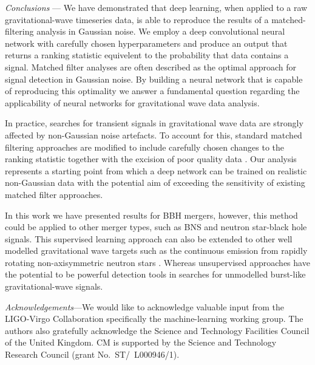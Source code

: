 \documentclass[%
showpacs,
 amsmath,amssymb,
 aps,
 twocolumn,
 prl,
 reprint,
floatfix,
]{revtex4-1}
\begin{document}
%
%
\textit{Conclusions} --- 
%
%
We have demonstrated that deep learning, when applied to a raw
gravitational-wave timeseries data, is able to reproduce the results of a
matched-filtering analysis in Gaussian noise. We employ a deep convolutional
neural network with carefully chosen hyperparameters and produce an output that
returns a ranking statistic equivelent to the probability that data contains a
signal. Matched filter analyses are often described as the optimal approach for
signal detection in Gaussian noise. By building a neural network that is
capable of reproducing this optimality we answer a fundamental question
regarding the applicability of neural networks for gravitational wave data
analysis. 

%
%
In practice, searches for transient signals in gravitational wave data are
strongly affected by non-Gaussian noise artefacts. To account for this,
standard matched filtering approaches are modified to include carefully chosen
changes to the ranking statistic together with the excision of poor quality
data \cite{0264-9381-28-23-235005}. Our analysis
represents a starting point from which a deep network can be trained on
realistic non-Gaussian data with the potential aim of exceeding the sensitivity
of existing matched filter approaches.

%
%
In this work we have presented results for \ac{BBH} mergers, however, this
method could be applied to other merger types, such as \ac{BNS} and neutron
star-black hole signals. This supervised learning approach can also be extended
to other well modelled gravitational wave targets such as the continuous
emission from rapidly rotating non-axisymmetric neutron stars \cite{1707.02669}. Whereas unsupervised approaches have the
potential to be powerful detection tools in searches for unmodelled burst-like
gravitational-wave signals. 

%
%
\emph{Acknowledgements}---We would like to acknowledge valuable input from the
LIGO-Virgo Collaboration specifically the machine-learning working group. The
authors also gratefully acknowledge the Science and Technology Facilities
Council of the United Kingdom.  CM is supported by the Science and Technology
Research Council (grant No.~ST/~L000946/1).
%




\end{document}
